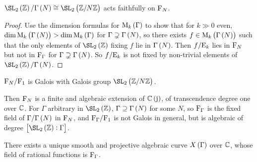 \begin{proposition}
$ \SL_2\br{\ZZ} / \Gamma\br{N} \cong \SL_2\br{\ZZ / N\ZZ} $ acts faithfully on $ \mathrm{F}_N $.
\end{proposition}

\begin{proof}
Use the dimension formulas for $ \M_k\br{\Gamma} $ to show that for $ k \gg 0 $ even, $ \dim \M_k\br{\Gamma\br{N}} > \dim \M_k\br{\Gamma} $ for $ \Gamma \supsetneq \Gamma\br{N} $, so there exists $ f \in \M_k\br{\Gamma\br{N}} $ such that the only elements of $ \SL_2\br{\ZZ} $ fixing $ f $ lie in $ \Gamma\br{N} $. Then $ f / \mathrm{E}_k $ lies in $ \mathrm{F}_N $ but not in $ \mathrm{F}_\Gamma $ for $ \Gamma \supsetneq \Gamma\br{N} $. So $ f / \mathrm{E}_k $ is not fixed by non-trivial elements of $ \SL_2\br{\ZZ} / \Gamma\br{N} $.
\end{proof}

\begin{corollary}
$ \mathrm{F}_N / \mathrm{F}_1 $ is Galois with Galois group $ \SL_2\br{\ZZ / N\ZZ} $.
\end{corollary}

Then $ \mathrm{F}_N $ is a finite and algebraic extension of $ \CC\br{\j} $, of transcendence degree one over $ \mathbb{C} $. For $ \Gamma $ arbitrary in $ \SL_2\br{\ZZ} $, $ \Gamma \supseteq \Gamma\br{N} $ for some $ N $, so $ \mathrm{F}_\Gamma $ is the fixed field of $ \Gamma / \Gamma\br{N} $ in $ \mathrm{F}_N $, and $ \mathrm{F}_\Gamma / \mathrm{F}_1 $ is not Galois in general, but is algebraic of degree $ \sbr{\SL_2\br{\ZZ} : \Gamma} $.

\begin{proposition}
There exists a unique smooth and projective algebraic curve $ X\br{\Gamma} $ over $ \mathbb{C} $, whose field of rational functions is $ \mathrm{F}_\Gamma $.
\end{proposition}

